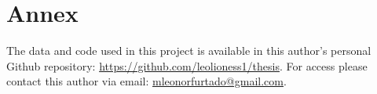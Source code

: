 

\chapter{Annex}
\label{annex_1}

The data and code used in this project is available in this author's personal Github repository: \url{https://github.com/leolioness1/thesis}.
For access please contact this author via email: \url{mleonorfurtado@gmail.com}.

